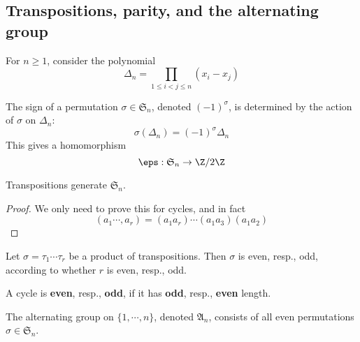 \subsection{Transpositions, parity, and the alternating group}
For $n\geq 1$, consider the polynomial
\[\Delta_n=\prod_{1\leq i<j\leq n}(x_i-x_j)\]
\begin{definition}
The sign of a permutation $\sigma\in\mathfrak{S}_n$, denoted $(-1)^\sigma$, is determined by the action of $\sigma$ on $\Delta_n$:
\[\sigma(\Delta_n)=(-1)^\sigma\Delta_n\]
This gives a homomorphism 
\[\eps:\mathfrak{S}_n\to\Z/2\Z\]
\end{definition}
\begin{lemma}
Transpositions generate $\mathfrak{S}_n$.
\end{lemma}
\begin{proof}
We only need to prove this for cycles, and in fact
\[(a_1\cdots,a_r)=(a_1a_r)\cdots(a_1a_3)(a_1a_2)\]
\end{proof}
\begin{lemma}
Let $\sigma=\tau_1\cdots\tau_r$ be a product of transpositions. Then $\sigma$ is even, resp., odd, according to whether $r$ is even, resp., odd.
\end{lemma}
\begin{corollary}
A cycle is \textbf{even}, resp., \textbf{odd}, if it has \textbf{odd}, resp., \textbf{even} length.
\end{corollary}
\begin{definition}
The alternating group on $\{1,\cdots,n\}$, denoted $\mathfrak{A}_n$, consists of all even permutations $\sigma\in\mathfrak{S}_n$.
\end{definition}
